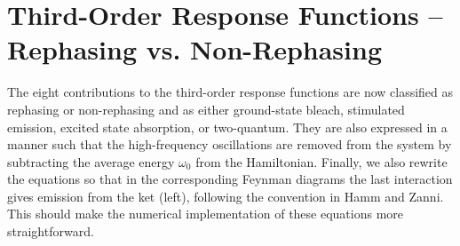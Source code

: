 \documentclass{article}
\begin{document}
\clearpage
\section{Third-Order Response Functions -- Rephasing vs. Non-Rephasing}
The eight contributions to the third-order response functions are now classified as rephasing or non-rephasing and as either ground-state bleach, stimulated emission, excited state absorption, or two-quantum.\cite{Hamm2011}
They are also expressed in a manner such that the high-frequency oscillations are removed from the system by subtracting the average energy $\omega_{0}$ from the Hamiltonian.
Finally, we also rewrite the equations so that in the corresponding Feynman diagrams the last interaction gives emission from the ket (left), following the convention in Hamm and Zanni.\cite{Hamm2011}
This should make the numerical implementation of these equations more straightforward.
\end{document}
